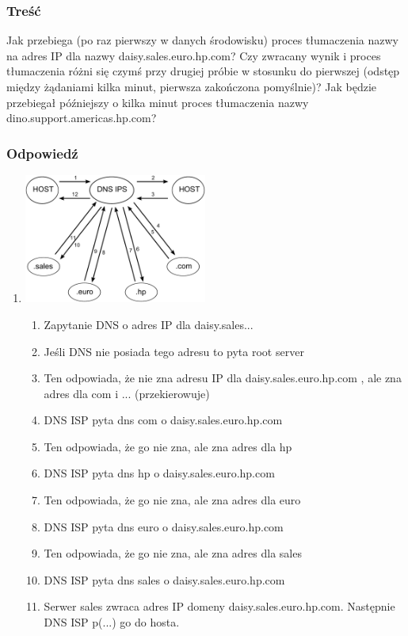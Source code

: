 		\subsubsection{Treść}
			Jak przebiega (po raz pierwszy w danych środowisku) proces tłumaczenia nazwy na adres IP dla nazwy daisy.sales.euro.hp.com? Czy zwracany wynik i proces tłumaczenia różni się czymś przy drugiej próbie w stosunku do pierwszej (odstęp między żądaniami kilka minut, pierwsza zakończona pomyślnie)? Jak będzie przebiegał późniejszy o kilka minut proces tłumaczenia nazwy dino.support.americas.hp.com?
		\subsubsection{Odpowiedź}
			\begin{enumerate}[A]
				\item \includegraphics[width=6cm]{./images/zadanie01.pdf}\\
				\begin{enumerate}[1]
					\item Zapytanie DNS o adres IP dla daisy.sales...
					\item Jeśli DNS nie posiada tego adresu to pyta root server
					\item Ten odpowiada, że nie zna adresu IP dla daisy.sales.euro.hp.com , ale zna adres dla com i ... (przekierowuje)
					\item DNS ISP pyta dns com o daisy.sales.euro.hp.com
					\item Ten odpowiada, że go nie zna, ale zna adres dla hp
					\item DNS ISP pyta dns hp o daisy.sales.euro.hp.com
					\item Ten odpowiada, że go nie zna, ale zna adres dla euro
					\item DNS ISP pyta dns euro o daisy.sales.euro.hp.com
					\item Ten odpowiada, że go nie zna, ale zna adres dla sales
					\item DNS ISP pyta dns sales o daisy.sales.euro.hp.com
					\item Serwer sales zwraca adres IP domeny daisy.sales.euro.hp.com. Następnie DNS ISP p(...) go do hosta.

\end{enumerate}
\end{enumerate}

